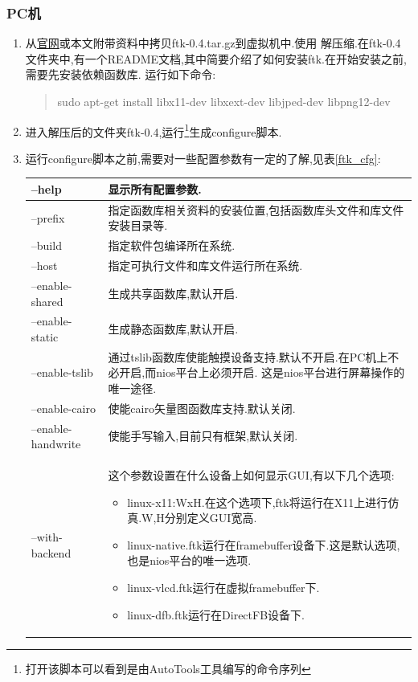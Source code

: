 \documentclass[12pt,a4paper,titlepage]{article}
\begin{document}
\subsubsection{PC机}
\begin{enumerate}
\item 从\href{http://code.google.com/p/ftk/downloads/list}{官网}或本文附带资料中拷贝ftk-0.4.tar.gz到虚拟机中.使用
解压缩.在ftk-0.4文件夹中,有一个README文档,其中简要介绍了如何安装ftk.在开始安装之前,需要先安装依赖函数库.
运行如下命令:
\begin{verse}
sudo apt-get install libx11-dev libxext-dev libjped-dev libpng12-dev
\end{verse}
\item 进入解压后的文件夹ftk-0.4,运行\footnote{打开该脚本可以看到是由AutoTools工具编写的命令序列}生成configure脚本.
\item 运行configure脚本之前,需要对一些配置参数有一定的了解,见表\ref{ftk_cfg}:
\begin{table}[!bhtp]
\centering
\begin{tabular}{|p{}|p{}|}
\hline
--help & 显示所有配置参数.\\\hline
--prefix & 指定函数库相关资料的安装位置,包括函数库头文件和库文件安装目录等.\\\hline
--build & 指定软件包编译所在系统.\\\hline
--host & 指定可执行文件和库文件运行所在系统.\\\hline
--enable-shared & 生成共享函数库,默认开启.\\\hline
--enable-static & 生成静态函数库,默认开启.\\\hline
--enable-tslib & 通过tslib函数库使能触摸设备支持.默认不开启.在PC机上不必开启,而nios平台上必须开启.
这是nios平台进行屏幕操作的唯一途径.\\\hline
--enable-cairo & 使能cairo矢量图函数库支持.默认关闭.\\\hline
--enable-handwrite & 使能手写输入,目前只有框架,默认关闭.\\\hline
--with-backend & 这个参数设置在什么设备上如何显示GUI,有以下几个选项:
\begin{itemize}
\item linux-x11:WxH.在这个选项下,ftk将运行在X11上进行仿真.W,H分别定义GUI宽高.
\item linux-native.ftk运行在framebuffer设备下.这是默认选项,也是nios平台的唯一选项.
\item linux-vlcd.ftk运行在虚拟framebuffer下.
\item linux-dfb.ftk运行在DirectFB设备下.

\end{itemize}
\end{tabular}
\end{table}
\end{enumerate}
\end{document}
